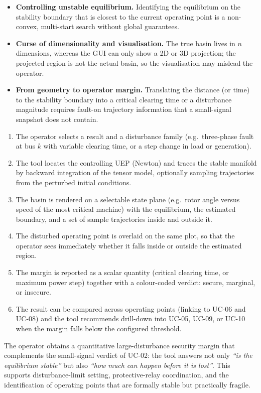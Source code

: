 \begin{description}
        \begin{itemize}[before=\leavevmode, leftmargin=*]
          \item \textbf{Controlling unstable equilibrium.} Identifying the equilibrium on the stability boundary that is closest to the current operating point is a non-convex, multi-start search without global guarantees.
          \item \textbf{Curse of dimensionality and visualisation.} The true basin lives in $n$ dimensions, whereas the GUI can only show a 2D or 3D projection; the projected region is not the actual basin, so the visualisation may mislead the operator.
          \item \textbf{From geometry to operator margin.} Translating the distance (or time) to the stability boundary into a critical clearing time or a disturbance magnitude requires fault-on trajectory information that a small-signal snapshot does not contain.
        \end{itemize}
  \item[Proposed flow.]
        \begin{enumerate}[before=\leavevmode, leftmargin=*]
          \item The operator selects a result and a disturbance family (e.g.\ three-phase fault at bus $k$ with variable clearing time, or a step change in load or generation).
          \item The tool locates the controlling UEP (Newton) and traces the stable manifold by backward integration of the tensor model, optionally sampling trajectories from the perturbed initial conditions.
          \item The basin is rendered on a selectable state plane (e.g.\ rotor angle versus speed of the most critical machine) with the equilibrium, the estimated boundary, and a set of sample trajectories inside and outside it.
          \item The disturbed operating point is overlaid on the same plot, so that the operator sees immediately whether it falls inside or outside the estimated region.
          \item The margin is reported as a scalar quantity (critical clearing time, or maximum power step) together with a colour-coded verdict: secure, marginal, or insecure.
          \item The result can be compared across operating points (linking to UC-06 and UC-08) and the tool recommends drill-down into UC-05, UC-09, or UC-10 when the margin falls below the configured threshold.
        \end{enumerate}
  \item[Expected value.] The operator obtains a quantitative large-disturbance security margin that complements the small-signal verdict of UC-02: the tool answers not only \emph{``is the equilibrium stable''} but also \emph{``how much can happen before it is lost''}. This supports disturbance-limit setting, protective-relay coordination, and the identification of operating points that are formally stable but practically fragile.
\end{description}

